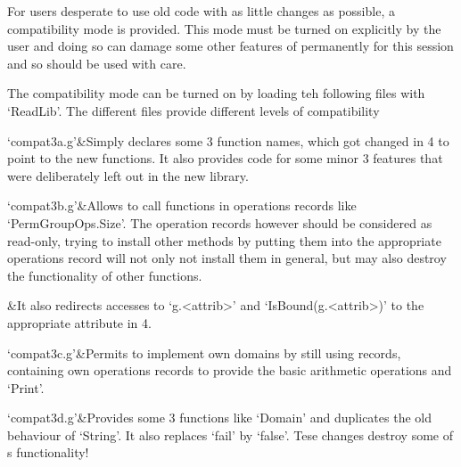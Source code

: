 
For users desperate to use old code with as little changes as possible, a
compatibility mode is provided. This mode must be turned on explicitly by
the user and doing so can damage some other features of {\GAP} permanently
for this session and so should be used with care.

The compatibility mode can be turned on by loading teh following files with
`ReadLib'. The different files provide different levels of compatibility

\beginitems
`compat3a.g'&Simply declares some {\GAP}3 function names, which got changed
in {\GAP}4 to point to the new functions. It also provides code for some
minor {\GAP}3 features that were deliberately left out in the new library.

`compat3b.g'&Allows to call functions in operations records like
`PermGroupOps.Size'. The operation records however should be considered as
read-only, trying to install other methods by putting them into the
appropriate operations record will not only not install them in general, but
may also destroy the functionality of other functions.

&It also redirects accesses to `g.<attrib>' and `IsBound(g.<attrib>)' to the
appropriate attribute in {\GAP}4.

`compat3c.g'&Permits to implement own domains by still using records,
containing own operations records to provide the basic arithmetic operations
and `Print'.

`compat3d.g'&Provides some {\GAP}3 functions like `Domain' and duplicates
the old behaviour of `String'. It also replaces `fail' by `false'. Tese
changes destroy some of {\GAP}s functionality! 

\enditems

